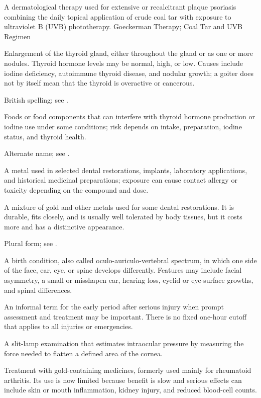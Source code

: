  A dermatological therapy used for extensive or recalcitrant plaque psoriasis combining the daily topical application of crude coal tar with exposure to ultraviolet B (UVB) phototherapy.
\synonyms
Goeckerman Therapy; Coal Tar and UVB Regimen

 Enlargement of the thyroid gland, either throughout the gland or as one or more nodules. Thyroid hormone levels may be normal, high, or low. Causes include iodine deficiency, autoimmune thyroid disease, and nodular growth; a goiter does not by itself mean that the thyroid is overactive or cancerous.

 British spelling; see .

 Foods or food components that can interfere with thyroid hormone production or iodine use under some conditions; risk depends on intake, preparation, iodine status, and thyroid health.

 Alternate name; see .

 A metal used in selected dental restorations, implants, laboratory applications, and historical medicinal preparations; exposure can cause contact allergy or toxicity depending on the compound and dose.

 A mixture of gold and other metals used for some dental restorations. It is durable, fits closely, and is usually well tolerated by body tissues, but it costs more and has a distinctive appearance.

 Plural form; see .

 A birth condition, also called oculo-auriculo-vertebral spectrum, in which one side of the face, ear, eye, or spine develops differently. Features may include facial asymmetry, a small or misshapen ear, hearing loss, eyelid or eye-surface growths, and spinal differences.

 An informal term for the early period after serious injury when prompt assessment and treatment may be important. There is no fixed one-hour cutoff that applies to all injuries or emergencies.

 A slit-lamp examination that estimates intraocular pressure by measuring the force needed to flatten a defined area of the cornea.

 Treatment with gold-containing medicines, formerly used mainly for rheumatoid arthritis. Its use is now limited because benefit is slow and serious effects can include skin or mouth inflammation, kidney injury, and reduced blood-cell counts.

